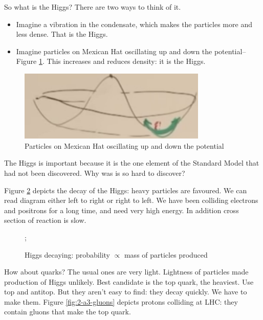 \documentclass[]{article}
\begin{document}
So what is the Higgs? There are two ways to think of it.
\begin{itemize}
	\item Imagine a vibration in the condensate, which makes the particles more and less dense. That is the Higgs.
	\item Imagine particles on Mexican Hat oscillating up and down the potential--Figure \ref{fig:2-a3-higgs1}. This increases and reduces density: it is the Higgs.
\end{itemize}

\begin{figure}[H]
	\caption{Particles on Mexican Hat oscillating up and down the potential}\label{fig:2-a3-higgs1}
	\includegraphics[width=0.8\textwidth]{2-a3-higgs1}
\end{figure}

The Higgs is important because it is the one element of the Standard Model that had not been discovered. Why was is so hard to discover?

Figure \ref{fig:2-a3-higgs-decay} depicts the decay of the Higgs: heavy particles are favoured. We can read diagram either left to right or right to left. We have been colliding electrons and positrons for a long time, and need very high energy. In addition cross section of reaction is slow.

\begin{figure}[H]
	\begin{center}
		\caption{Higgs decaying: probability $\propto$ mass of particles produced}\label{fig:2-a3-higgs-decay}
		;
	\end{center}
\end{figure}

How about quarks? The usual ones are very light. Lightness of particles made production of Higgs unlikely. Best candidate is the top quark, the heaviest. Use top and antitop. But they aren't easy to find: they decay quickly. We have to make them. Figure \ref{fig:2-a3-gluons} depicts protons colliding at LHC: they contain gluons that make the top quark. 
\end{document}
